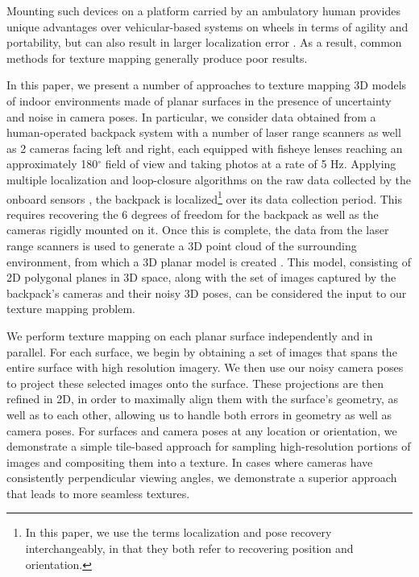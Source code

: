 \documentclass[]{spie}  %
\begin{document}
Mounting such devices on a platform carried by an ambulatory human
provides unique advantages over vehicular-based systems on wheels in
terms of agility and portability, but can also result in larger
localization error \cite{liu2010indoor}. As a result, common methods
for texture mapping generally produce poor results.

In this paper, we present a number of approaches to texture mapping 3D
models of indoor environments made of planar surfaces in the presence
of uncertainty and noise in camera poses. In particular, we consider
data obtained from a human-operated backpack system with a number of
laser range scanners as well as 2 cameras facing left and right, each
equipped with fisheye lenses reaching an approximately 180$^{\circ}$
field of view and taking photos at a rate of 5 Hz. Applying multiple
localization and loop-closure algorithms on the raw data collected by
the onboard sensors \cite{chen2010indoor, kua2012loopclosure,
  liu2010indoor}, the backpack is localized\footnote{In this paper, we
  use the terms localization and pose recovery interchangeably, in
  that they both refer to recovering position and orientation.}  over
its data collection period. This requires recovering the 6 degrees of
freedom for the backpack as well as the cameras rigidly mounted on
it. Once this is complete, the data from the laser range scanners is
used to generate a 3D point cloud of the surrounding environment, from
which a 3D planar model is created \cite{sanchez2012point}. This
model, consisting of 2D polygonal planes in 3D space, along with the
set of images captured by the backpack's cameras and their noisy 3D
poses, can be considered the input to our texture mapping problem.

We perform texture mapping on each planar surface independently and in
parallel. For each surface, we begin by obtaining a set of images that
spans the entire surface with high resolution imagery. We then use our
noisy camera poses to project these selected images onto the
surface. These projections are then refined in 2D, in order to
maximally align them with the surface's geometry, as well as to each
other, allowing us to handle both errors in geometry as well as camera
poses. For surfaces and camera poses at any location or orientation,
we demonstrate a simple tile-based approach for sampling
high-resolution portions of images and compositing them into a
texture. In cases where cameras have consistently perpendicular
viewing angles, we demonstrate a superior approach that leads to more
seamless textures.
\end{document}
